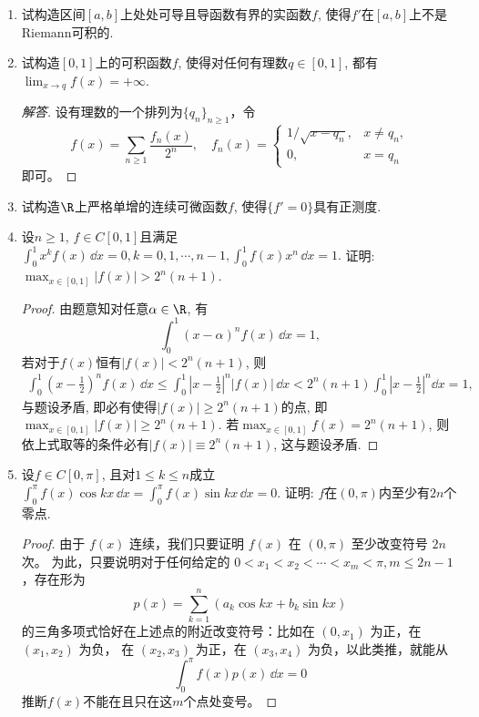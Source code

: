 \begin{quizb}
\begin{enumerate}
\item 试构造区间\([a,b]\)上处处可导且导函数有界的实函数\(f\), 
使得\(f'\)在\([a,b]\)上不是Riemann可积的.

\item 试构造\([0,1]\)上的可积函数\(f\), 使得对任何有理数\(q\in[0,1]\), 
都有\(\lim_{x\rightarrow q}f(x)=+\infty\).
\begin{proof}[解答]
    设有理数的一个排列为$\{q_n\}_{n\geqslant1}$，令
    \[f(x)=\sum_{n\geqslant1}\frac{f_n(x)}{2^n},
    \quad f_n(x)=\begin{cases}1/\sqrt{x-q_n},&x \ne q_n,\\0,&x=q_n\end{cases}\]
    即可。
\end{proof}

\item 试构造\(\R\)上严格单增的连续可微函数\(f\), 使得\(\{f'=0\}\)具有正测度.

\item 设\(n\geqslant 1\), \(f\in C[0,1]\)且满足
\(\int_{0}^{1}x^kf(x)\,\dd x=0,k=0,1,\cdots,n-1,\int_{0}^{1}f(x)x^n\,\dd x=1.\) 
证明: \(\max_{x\in[0,1]}|f(x)|>2^n(n+1)\).
\begin{proof}
由题意知对任意\(\alpha\in\R\), 有\[\int_{0}^{1}(x-\alpha)^nf(x)\,\dd x=1,\]
若对于\(f(x)\)恒有\(|f(x)|<2^n(n+1)\), 则\[\begin{split}
\int_{0}^{1}\left(x-\frac{1}{2}\right)^nf(x)\,\dd x
\leqslant\int_{0}^{1}\left|x-\frac{1}{2}\right|^n|f(x)|\,\dd x
<2^n(n+1)\int_{0}^{1}\left|x-\frac{1}{2}\right|^n\dd x=1,
\end{split}\]与题设矛盾, 即必有使得\(|f(x)|\geqslant 2^n(n+1)\)的点, 
即\(\max_{x\in[0,1]}|f(x)|\geqslant 2^n(n+1)\). 
若\(\max_{x\in[0,1]}f(x)=2^n(n+1)\), 
则依上式取等的条件必有\(|f(x)|\equiv 2^n(n+1)\), 这与题设矛盾.
\end{proof}

\item 设\(f\in C[0,\pi]\), 且对\(1\leqslant k\leqslant n\)成立
\(\int_{0}^{\pi}f(x)\cos kx\,\dd x=\int_{0}^{\pi}f(x)\sin kx\,\dd x=0\). 
证明: \(f\)在\((0,\pi)\)内至少有\(2n\)个零点.
\begin{proof}
由于 $f(x)$ 连续，我们只要证明 $f(x)$ 在 $(0,\pi)$ 至少改变符号 $2n$ 次。
为此，只要说明对于任何给定的 $0<x_1<x_2<\cdots<x_m<\pi, m \leqslant 2n-1$，存在形为
$$p(x)=\sum_{k=1}^n\left(a_k \cos kx+b_k \sin kx\right)$$
的三角多项式恰好在上述点的附近改变符号：比如在 $(0,x_1)$ 为正，在 $(x_1,x_2)$ 为负，
在 $(x_2,x_3)$ 为正，在 $(x_3,x_4)$ 为负，以此类推，就能从
\[\int_0^\pi f(x)p(x)\,\dd x=0\]
推断$f(x)$不能在且只在这$m$个点处变号。


\end{proof}
\end{enumerate}
\end{quizb}
